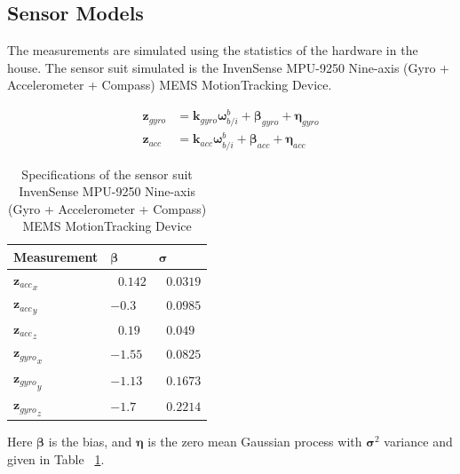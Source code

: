 \subsection{Sensor Models}

The measurements are simulated using the statistics of the hardware in the house.
The sensor suit simulated is the InvenSense MPU-9250 Nine-axis (Gyro + Accelerometer + Compass) MEMS MotionTracking Device. 
 
 \begin{align}
\bm{z}_{gyro} &= \bm{k}_{gyro} \bm{\omega}_{b/i}^b + \bm{\beta}_{gyro} + \bm{\eta}_{gyro}\\
\bm{z}_{acc} &= \bm{k}_{acc} \bm{\omega}_{b/i}^b + \bm{\beta}_{acc} + \bm{\eta}_{acc}
\end{align}

\begin{table}[!htbp]
\caption{Specifications of the sensor suit InvenSense MPU-9250 Nine-axis (Gyro + Accelerometer + Compass) MEMS MotionTracking Device\cite{condomines2015developpement}}
\label{arm:sensorSpecs}
\begin{center}
\begin{tabular}{ ||p{3cm}|p{2cm}|p{1.5cm}||}\hline
\textbf{Measurement} & $ \bm{\beta}$ &  $ \bm{\sigma}$ \\\hline
${\bm{z}_{acc}}_x$                  & $\ \ \, 0.142 $	   & $\ \ \, 0.0319$ \\\hline
${\bm{z}_{acc}}_y$       & $ -0.3 $           &  $\ \ \, 0.0985$ \\\hline
${\bm{z}_{acc}}_z$           & $\ \ \, 0.19$           & $\ \ \, 0.049$ \\\hline
${\bm{z}_{gyro}}_x$                  & $-1.55 $	   & $\ \ \, 0.0825$ \\\hline
${\bm{z}_{gyro}}_y$       & $ -1.13 $           &  $\ \ \, 0.1673$ \\\hline
${\bm{z}_{gyro}}_z$           & $-1.7$           & $\ \ \, 0.2214$ \\\hline
\end{tabular}
\end{center}
\end{table}

Here $\bm{\beta}$ is the bias, and $\bm{\eta}$ is the zero mean Gaussian process with $\bm{\sigma}^2$ variance and given in Table ~\ref{arm:sensorSpecs}.


